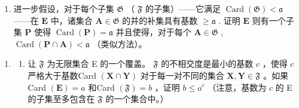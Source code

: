 \begin{enumerate}
\def\labelenumi{(\alph{enumi})}
\setcounter{enumi}{1}
\tightlist
\item
  进一步假设，对于每个子集 \(\mathfrak{G}\) （ \(\mathfrak{F}\) 的子集）——它满足 \(\operatorname{Card}(\mathfrak{G}) < \mathfrak{a}\) ——在 \(\mathbf{E}\) 中，诸集合 \(\mathbf{A} \in \mathfrak{G}\) 的并的补集具有基数 \(\geqslant \mathfrak{a}\) . 证明 \(\mathbf{E}\) 则有一个子集 \(\mathbf{P}\) 使得 \(\operatorname{Card}(\mathbf{P}) = \mathfrak{a}\) 并且使得，对于每个 \(\mathbf{A} \in \mathfrak{G}\) , \(\operatorname{Card}(\mathbf{P} \cap \mathbf{A}) < \mathfrak{a}\) （类似方法）。
\end{enumerate}

\begin{enumerate}
\def\labelenumi{\arabic{enumi}.}
\setcounter{enumi}{24}
\tightlist
\item
  \begin{enumerate}
  \def\labelenumii{(\alph{enumii})}
  \tightlist
  \item
    让 \(\mathfrak{F}\) 为无限集合 E 的一个覆盖。 \(\mathfrak{F}\) 的不相交度是最小的基数 \(c\) ，使得 \(c\) 严格大于基数Card \((\mathbf{X} \cap \mathbf{Y})\) 对于每一对不同的集合 \(\mathbf{X}, \mathbf{Y} \in \mathfrak{F}\) 。如果Card \((\mathbf{E}) = a\) 和Card \((\mathfrak{F}) = b\) ，证明 \(b \leqslant a^c\) （注意，基数为 \(c\) 的 E 的子集至多包含在 \(\mathfrak{F}\) 的一个集合中。）
  \end{enumerate}
\end{enumerate}

